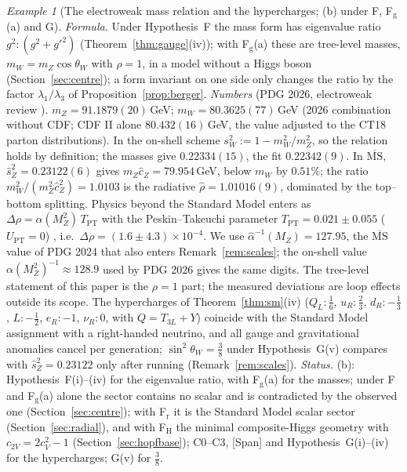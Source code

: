 \documentclass[aps,pra,onecolumn,superscriptaddress,nofootinbib,10pt]{revtex4-2}
\theoremstyle{definition}
\theoremstyle{remark}
\newtheorem{example}[theorem]{Example}
\begin{document}
\begin{example}[The electroweak mass relation and the hypercharges; (b) under F, F$_{\mathrm g}$(a) and G]\label{ex:ew}
\emph{Formula.}  Under Hypothesis~F the mass form has eigenvalue ratio $g^2:(g^2+g'^2)$ (Theorem~\ref{thm:gauge}(iv));
with F$_{\mathrm g}$(a) these are tree-level masses, $m_W=m_Z\cos\theta_W$ with $\rho=1$, in a model without a Higgs
boson (Section~\ref{sec:centre}); a form invariant on one side only
changes the ratio by the factor $\lambda_1/\lambda_3$ of Proposition~\ref{prop:berger}.
\emph{Numbers} (PDG 2026, electroweak review \cite{ex-PDG26}).  $m_Z=91.1879(20)$\,GeV;
$m_W=80.3625(77)$\,GeV (2026 combination without CDF; CDF II alone $80.432(16)$\,GeV, the value adjusted to the
CT18 parton distributions).  In the on-shell scheme $s_W^2:=1-m_W^2/m_Z^2$, so the relation holds by
definition; the masses give $0.22334(15)$, the fit $0.22342(9)$.  In $\overline{\mathrm{MS}}$, $\hat s_Z^2=0.23122(6)$
gives $m_Z\hat c_Z=79.954$\,GeV, below $m_W$ by $0.51\%$; the ratio $m_W^2/(m_Z^2\hat c_Z^2)=1.0103$ is the
radiative $\hat\rho=1.01016(9)$, dominated by the top--bottom splitting.  Physics beyond the Standard Model
enters as $\Delta\rho=\alpha(M_Z^2)\,T_{\mathrm{PT}}$ with the Peskin--Takeuchi parameter $T_{\mathrm{PT}}=0.021\pm0.055$
($U_{\mathrm{PT}}=0$) \cite{ex-PDG26}, i.e.\ $\Delta\rho=(1.6\pm4.3)\times10^{-4}$.  We use $\hat\alpha^{-1}(M_Z)=127.95$, the
$\overline{\mathrm{MS}}$ value of PDG 2024 \cite{PDG} that also enters Remark~\ref{rem:scales}; the on-shell value
$\alpha(M_Z^2)^{-1}\approx128.9$ \cite{ex-Steinhauser98} used by PDG 2026 gives the same digits.  The tree-level
statement of this paper is the $\rho=1$ part; the measured deviations are loop effects outside its scope.
The hypercharges of Theorem~\ref{thm:sm}(iv) ($Q_L:\tfrac16$, $u_R:\tfrac23$, $d_R:-\tfrac13$, $L:-\tfrac12$, $e_R:-1$,
$\nu_R:0$, with $Q=T_{3L}+Y$) coincide with the Standard Model assignment with a right-handed neutrino, and
all gauge and gravitational anomalies cancel per generation; $\sin^2\theta_W=\tfrac38$ under
Hypothesis~G(v) compares with $\hat s_Z^2=0.23122$ only after running (Remark~\ref{rem:scales}).
\emph{Status.}  (b): Hypothesis~F(i)--(iv) for the eigenvalue ratio, with F$_{\mathrm g}$(a) for the masses; under F and F$_{\mathrm g}$(a) alone the sector contains no scalar and is contradicted by the observed one (Section~\ref{sec:centre}); with F$_{\mathrm r}$ it is the Standard Model scalar sector (Section~\ref{sec:radial}), and with F$_{\mathrm H}$ the minimal composite-Higgs geometry with $c_{2V}=2c_V^2-1$ (Section~\ref{sec:hopfbase}); C0--C3, [Span] and Hypothesis~G(i)--(iv)
for the hypercharges; G(v) for $\tfrac38$.
\end{example}
\end{document}
